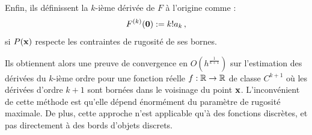 Enfin, ils définissent la $k$-ième dérivée de $F$ à l'origine comme :
%
\begin{equation}
    F^{(k)}(\mathbf{0}) := k!a_k \,,
\end{equation}
%
si $P(\mathbf{x})$ respecte les contraintes de rugosité de ses bornes.

Ils obtiennent alors une preuve de convergence en $O(h^{\frac{1}{k+1}})$ sur
l'estimation des dérivées du $k$-ième ordre pour une fonction réelle $f : \mathbb{R}
\rightarrow \mathbb{R}$ de classe $C^{k+1}$ où les dérivées d'ordre $k+1$ sont bornées
dans le voisinage du point $\mathbf{x}$. L'inconvénient de cette méthode est qu'elle
dépend énormément du paramètre de rugosité maximale. De plus, cette approche
n'est applicable qu'à des fonctions discrètes, et pas directement à des bords
d'objets discrets.
%
%
